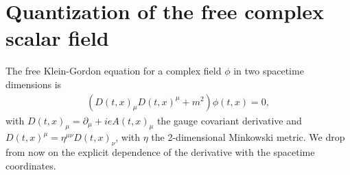 %



%

\section{Quantization of the free complex scalar field}

The free Klein-Gordon equation for a complex field $\phi$ in two spacetime dimensions is
\begin{align}
	(D(t, x)_\mu D(t, x)^{\mu} + m^2)\phi(t, x) = 0,
	\label{eq:Klein-Gordon}
\end{align}
with $D(t, x)_\mu = \partial_\mu +i e A(t, x)_\mu$ the gauge covariant derivative  and $D(t, x)^\mu = \eta^{\mu\nu}D(t, x)_\nu$, with $\eta$ the 2-dimensional Minkowski metric. We drop from now on the explicit dependence of the derivative with the spacetime coordinates.

